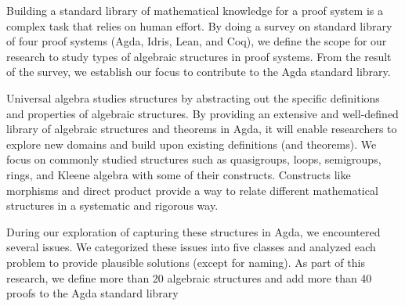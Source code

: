 Building a standard library of mathematical knowledge for a proof system is a
complex task that relies on human effort. By doing a survey on standard library
of four proof systems (Agda, Idris, Lean, and Coq), we define the scope for our
research to study types of algebraic structures in proof systems. From the
result of the survey, we establish our focus to contribute to the Agda standard
library. 

Universal algebra studies structures by abstracting out the specific definitions
and properties of algebraic structures. By providing an extensive and
well-defined library of algebraic structures and theorems in Agda, it will
enable researchers to explore new domains and build upon existing definitions
(and theorems). We focus on commonly studied structures such as quasigroups,
loops, semigroups, rings, and Kleene algebra with some of their constructs.
Constructs like morphisms and direct product provide a way to relate different
mathematical structures in a systematic and rigorous way. 

During our exploration of capturing these structures in Agda, we encountered
several issues. We categorized these issues into five classes and analyzed each
problem to provide plausible solutions (except for naming). As part
of this research, we define more than 20 algebraic structures and add more than
40 proofs to the Agda standard library